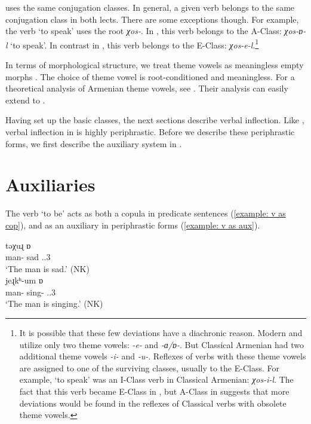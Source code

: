 {\seaSEA} uses the same conjugation classes. In general, a given verb belongs to the same conjugation class in both lects. There are some exceptions though. For example, the verb `to speak' uses the root \textit{{χos-}}. In {\iaIA}, this verb belongs to the A-Class: \textit{{χos-ɒ-l}} `to speak'. In contrast in {\seaSEA}, this verb belongs to the E-Class: \textit{{χos-e-l}}.\footnote{It is possible that these few deviations have a diachronic reason. Modern {\seaSE} and {\iaIA} utilize only two theme vowels: \textit{{-e-}} and \textit{{-ɑ/ɒ-}}. But Classical Armenian had two additional theme vowels \textit{{-i-}} and \textit{{-u-}}. Reflexes of verbs with these theme vowels are assigned to one of the surviving classes, usually to the E-Class. For example, `to speak' was an I-Class verb in Classical Armenian: \textit{{χos-i-l}}. The fact that this verb became E-Class in {\seaSEA}, but A-Class in {\iaIA} suggests that more deviations would be found in the reflexes of Classical verbs with obsolete theme vowels.}

In terms of morphological structure, we treat theme vowels as meaningless empty morphs \citep{Aronoff-1994-MorphologyItselfStemsInflectionClass}. The choice of theme vowel is root-conditioned and meaningless. 
For a theoretical analysis of Armenian theme vowels, see \citet{GuekguezianDolatian-2021-WCCFLThemeVowelWesternArmenianVerb}. Their {\swaSWA} analysis can easily extend to {\iaIA}. 



Having set up the basic classes, the next sections describe  verbal inflection. Like {\seaSEA}, verbal inflection in {\iaIA} is highly periphrastic. Before we describe these periphrastic forms, we first describe the auxiliary system in {\iaIA}.

\section{Auxiliaries}\label{section:verb:aux}

The verb `to be' acts as both a copula in predicate sentences (\ref{example: v as cop}), and as an auxiliary in periphrastic forms (\ref{example: v as aux}). 

\begin{exe}
	\ex 
	\begin{xlist}
		\ex {} {təχuɻ} {ɒ}	\\
		man-{} sad {\auxgloss}.{\prs}.3{\sg}
		\\
		\trans 	`The man is sad.'\label{example: v as cop} \hfill (NK)
		\\
		\ex {} {jeɻkʰ-um} {ɒ} 
		\\
		man-{} sing-{\impfcvb} {\auxgloss}.{\prs}.3{\sg}
		\\
		\trans 	`The man is singing.'\label{example: v as aux} \hfill (NK)
		\\
		
	\end{xlist}
\end{exe}

